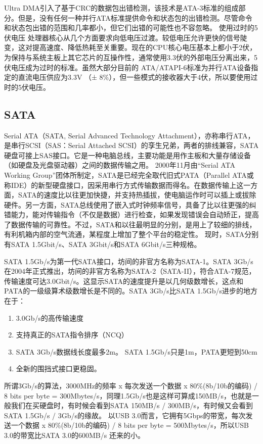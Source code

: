 Ultra DMA引入了基于CRC的数据包出错检测，该技术是ATA-3标准的组成部分。但是，没有任何一种并行ATA标准提供命令和状态包的出错检测。尽管命令和状态包出错的范围和几率都小，但它们出错的可能性也不容忽略。 
使用过时的5伏电压 
处理器核心从几个方面要求向低电压过渡。较低电压允许更快的信号陡变，这对提高速度、降低热耗至关重要。现在的CPU核心电压基本上都小于2伏，为保持与系统主板上其它芯片的互操作性，通常使用3.3伏的外部电压分离出来，5伏电压成为过时的标准。虽然大部分目前的 ATA/ATAPI-6标准为并行ATA设备指定的直流电压供应为3.3V （± 8\%），但一些模式的接收器大于4伏，所以要使用过时的5伏电压。 

\subsection{SATA}
Serial ATA（SATA, Serial Advanced Technology Attachment），亦称串行ATA，是串行SCSI（SAS：Serial Attached SCSI）的孪生兄弟，两者的排线兼容，SATA硬盘可接上SAS接口。它是一种电脑总线，主要功能是用作主板和大量存储设备（如硬盘及光盘驱动器）之间的数据传输之用。
2000年11月由“Serial ATA Working Group”团体所制定，SATA是已经完全取代旧式PATA（Parallel ATA或称IDE）的新型硬盘接口，因采用串行方式传输数据而得名。在数据传输上这一方面，SATA的速度比以往更加快捷，并支持热插拔，使电脑运作时可以插上或拔除硬件。另一方面，SATA总线使用了嵌入式时钟频率信号，具备了比以往更强的纠错能力，能对传输指令（不仅是数据）进行检查，如果发现错误会自动矫正，提高了数据传输的可靠性。不过，SATA和以往最明显的分别，是用上了较细的排线，有利机箱内部的空气流通，某程度上增加了整个平台的稳定性。
现时，SATA分别有SATA 1.5Gbit/s、SATA 3Gbit/s和SATA 6Gbit/s三种规格。

SATA 1.5Gb/s为第一代SATA接口，坊间的非官方名称为SATA-1。SATA 3Gb/s在2004年正式推出，坊间的非官方名称为SATA-2（SATA-II），符合ATA-7规范，传输速度可达3.0Gbit/s。这显示SATA的速度提升是以几何级数增长，这点和PATA的一级级算术级数增长是不同的。SATA 3Gb/s比SATA 1.5Gb/s进步的地方在于：
\begin{enumerate}
    \item 
3.0Gb/s的高传输速度
    \item 
支持真正的SATA指令排序（NCQ）
    \item 
SATA 3Gb/s数据线长度最多2m。 SATA 1.5Gb/s只是1m，PATA更短到50cm
    \item 
全新的围挡式接口更稳固。
\end{enumerate}
所谓3Gb/s的算法，3000MHz的频率 x 每次发送一个数据 x 80\%(8b/10b的编码) / 8 bits per byte = 300Mbytes/s，同理1.5Gb/s也是这样可算成150MB/s，也就是一般我们在买硬盘时，有时候会看到SATA 150MB/s / 300MB/s，有时候又会看到SATA 1.5Gb/s / 3Gb/s的缘故。
以USB 3.0而言，它拥有5Gbps的带宽，每次发送一个数据 x 80\%(8b/10b的编码) / 8 bits per byte = 500Mbytes/s，所以USB 3.0的带宽比SATA 3.0的600MB/s 还来的小。

